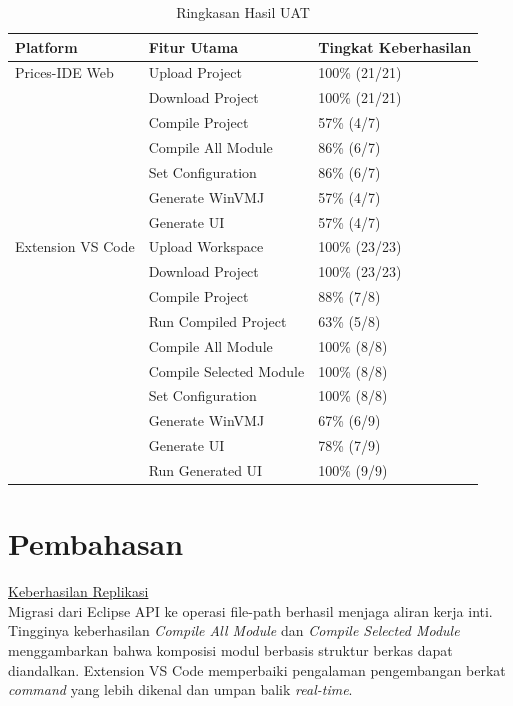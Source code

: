 \documentclass[12pt,a4paper,onecolumn]{article}
\begin{document}
\begin{table}[H]
\centering
\caption{Ringkasan Hasil UAT}
\label{tab:hasil-uat}
\begin{tabularx}{\textwidth}{@{}lXX@{}}
\toprule
\textbf{Platform} & \textbf{Fitur Utama} & \textbf{Tingkat Keberhasilan} \\
\midrule
Prices-IDE Web & Upload Project & 100\% (21/21) \\
& Download Project & 100\% (21/21) \\
& Compile Project & 57\% (4/7) \\
& Compile All Module & 86\% (6/7) \\
& Set Configuration & 86\% (6/7) \\
& Generate WinVMJ & 57\% (4/7) \\
& Generate UI & 57\% (4/7) \\
\midrule
Extension VS Code & Upload Workspace & 100\% (23/23) \\
& Download Project & 100\% (23/23) \\
& Compile Project & 88\% (7/8) \\
& Run Compiled Project & 63\% (5/8) \\
& Compile All Module & 100\% (8/8) \\
& Compile Selected Module & 100\% (8/8) \\
& Set Configuration & 100\% (8/8) \\
& Generate WinVMJ & 67\% (6/9) \\
& Generate UI & 78\% (7/9) \\
& Run Generated UI & 100\% (9/9) \\
\bottomrule
\end{tabularx}
\end{table}

\section*{Pembahasan}
\underline{Keberhasilan Replikasi} \vspace{5pt} \\
Migrasi dari Eclipse API ke operasi file-path berhasil menjaga aliran kerja inti. Tingginya keberhasilan \textit{Compile All Module} dan \textit{Compile Selected Module} menggambarkan bahwa komposisi modul berbasis struktur berkas dapat diandalkan. Extension VS Code memperbaiki pengalaman pengembangan berkat \textit{command} yang lebih dikenal dan umpan balik \textit{real-time}.
\end{document}
